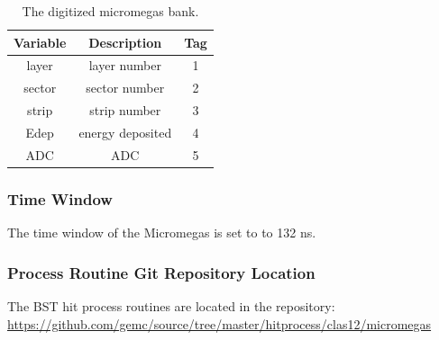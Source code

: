 \begin{table}[h]
	\begin{center}
		\begin{tabular}{| c | c | c |}
			\hline \hline
			Variable         & Description  & Tag  \\
			\hline
              layer  &                                      layer number  &    1   \\
             sector  &                                     sector number  &    2   \\
              strip  &                                      strip number  &    3   \\
               Edep  &                                  energy deposited  &    4   \\
                ADC  &                                               ADC  &    5   \\
			\hline \hline
		\end{tabular}
	\end{center}
	\caption{The digitized micromegas bank.}\label{tab:mmBank}
\end{table}

\subsubsection{Time Window}
The time window  of the Micromegas is set to to 132 ns.

\subsubsection{Process Routine Git Repository Location}
The BST hit process routines are located in the repository: \url{https://github.com/gemc/source/tree/master/hitprocess/clas12/micromegas}

